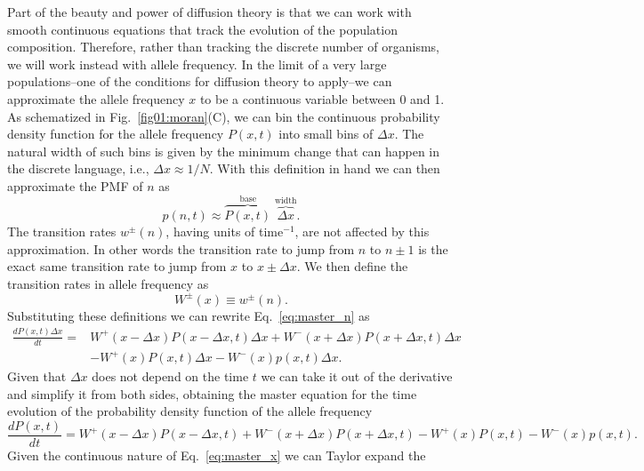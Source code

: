 Part of the beauty and power of diffusion theory is that we can work with smooth
continuous equations that track the evolution of the population composition.
Therefore, rather than tracking the discrete number of organisms, we will work
instead with allele frequency. In the limit of a very large populations--one of
the conditions for diffusion theory to apply--we can approximate the allele
frequency $x$ to be a continuous variable between 0 and 1. As schematized in
Fig.~\ref{fig01:moran}(C), we can bin the continuous probability density
function for the allele frequency $P(x, t)$ into small bins of $\Delta x$. The
natural width of such bins is given by the minimum change that can happen in the
discrete language, i.e., $\Delta x \approx 1 / N$. With this definition in hand
we can then approximate the PMF of $n$ as
\begin{equation}
  p(n, t) \approx
  \overbrace{P(x, t)}^{\text{base}} \;
  \overbrace{\Delta x}^{\text{width}}.
\end{equation}
The transition rates $w^\pm(n)$, having units of time$^{-1}$, are not affected
by this approximation. In other words the transition rate to jump from $n$ to $n
\pm 1$ is the exact same transition rate to jump from $x$ to $x \pm \Delta x$.
We then define the transition rates in allele frequency as
\begin{equation}
  W^\pm(x) \equiv w^\pm(n).
\end{equation}
Substituting these definitions we can rewrite Eq.~\ref{eq:master_n} as
\begin{equation}
\begin{split}
    \frac{dP(x, t) \Delta x}{dt} = 
    &W^+(x - \Delta x) P(x - \Delta x, t) \Delta x
    + W^-(x + \Delta x) P(x + \Delta x, t) \Delta x\\
    &- W^+(x) P(x, t) \Delta x
    - W^-(x) p(x, t) \Delta x.
\end{split}
\end{equation}
Given that $\Delta x$ does not depend on the time $t$ we can take it out of the
derivative and simplify it from both sides, obtaining the master equation for
the time evolution of the probability density function of the allele frequency
\begin{equation}
    \frac{dP(x, t)}{dt} = 
    W^+(x - \Delta x) P(x - \Delta x, t)
    + W^-(x + \Delta x) P(x + \Delta x, t)
    - W^+(x) P(x, t) 
    - W^-(x) p(x, t).
    \label{eq:master_x} 
\end{equation}
Given the continuous nature of Eq.~\ref{eq:master_x} we can Taylor expand the
